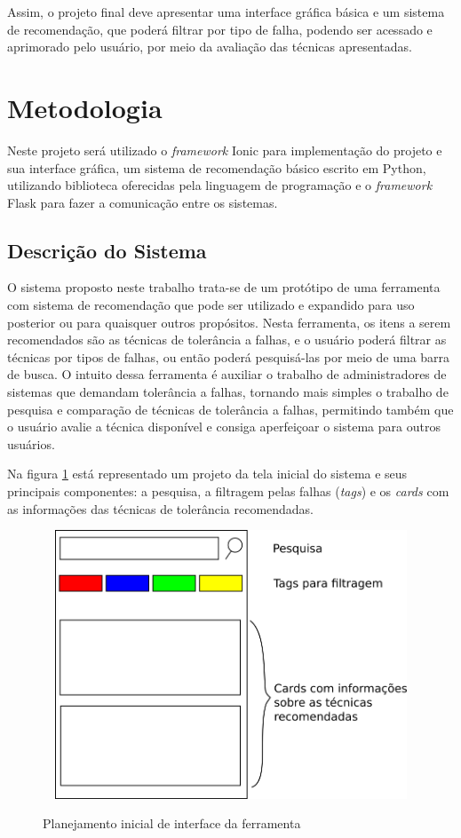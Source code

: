 \documentclass[
	12pt,				%
	oneside,			%
	a4paper,			%
	chapter=TITLE,		%
	english,			%
	french,				%
	spanish,			%
	brazil				%
	]{abntex2}
\begin{document}
Assim, o projeto final deve apresentar uma interface gráfica básica e um sistema de recomendação, que poderá filtrar por tipo de falha, podendo ser acessado e aprimorado pelo usuário, por meio da avaliação das técnicas apresentadas.

\section{Metodologia}

Neste projeto será utilizado o \emph{framework} Ionic para implementação do projeto e sua interface gráfica, um sistema de recomendação básico escrito em Python, utilizando biblioteca oferecidas pela linguagem de programação e o \emph{framework} Flask para fazer a comunicação entre os sistemas.

\subsection{Descrição do Sistema}

O sistema proposto neste trabalho trata-se de um protótipo de uma ferramenta com sistema de recomendação que pode ser utilizado e expandido para uso posterior ou para quaisquer outros propósitos. Nesta ferramenta, os itens a serem recomendados são as técnicas de tolerância a falhas, e o usuário poderá filtrar as técnicas por tipos de falhas, ou então poderá pesquisá-las por meio de uma barra de busca. O intuito dessa ferramenta é auxiliar o trabalho de administradores de sistemas que demandam tolerância a falhas, tornando mais simples o trabalho de pesquisa e comparação de técnicas de tolerância a falhas, permitindo também que o usuário avalie a técnica disponível e consiga aperfeiçoar o sistema para outros usuários.

Na figura \ref{fig:mockup} está representado um projeto da tela inicial do sistema e seus principais componentes: a pesquisa, a filtragem pelas falhas (\emph{tags}) e os \emph{cards} com as informações das técnicas de tolerância recomendadas.

\begin{figure}[H]
    \centering
    \caption{Planejamento inicial de interface da ferramenta}
    \includegraphics[width=12.0cm,height=8.0cm]{images/mockup.png}
    \label{fig:mockup}
    \textual
\end{figure}
\end{document}
